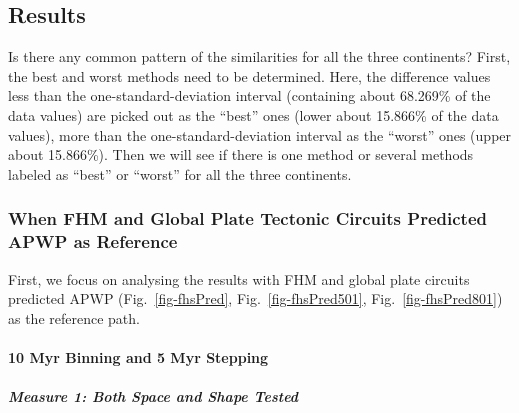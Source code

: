 \subsection{Results}

Is there any common pattern of the similarities for all the three continents?
First, the best and worst methods need to be determined. Here, the difference
values less than the one-standard-deviation interval (containing about 68.269\%
of the data values) are picked out as the ``best'' ones (lower about 15.866\% of
the data values), more than the one-standard-deviation interval as the ``worst''
ones (upper about 15.866\%). Then we will see if there is one method or several
methods labeled as ``best'' or ``worst'' for all the three continents.

\subsubsection{When FHM and Global Plate Tectonic Circuits Predicted APWP as
Reference}

First, we focus on analysing the results with FHM and global plate circuits
predicted APWP (Fig.~\ref{fig-fhsPred}, Fig.~\ref{fig-fhsPred501},
Fig.~\ref{fig-fhsPred801}) as the reference path.

\paragraph{10 Myr Binning and 5 Myr Stepping}

\subparagraph{Measure 1: Both Space and Shape Tested}

